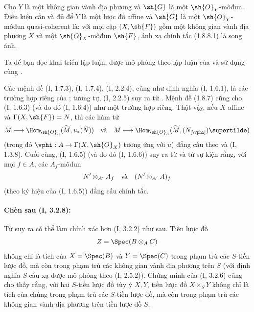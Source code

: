 \documentclass[oneside,10pt]{amsart}
\makeatletter
\newcommand{\ega@arrow}[2]{\mathchoice{#1}{#2}{#2}{#2}}
\renewcommand{\to}{\ega@arrow{\longrightarrow}{\rightarrow}}
\let\EGAOriginalLabel\label
\renewcommand{\label}[1]{\phantomsection\EGAOriginalLabel{#1}}
\makeatother
\begin{document}
\begin{corollary}[1.8.10]
\label{ega2:addendum:I.1.8.10}
Cho $Y$ là một không gian vành địa phương và $\sh{G}$ là một
$\sh{O}_Y$-môđun. Điều kiện cần và đủ để $Y$ là một lược đồ affine và
$\sh{G}$ là một $\sh{O}_Y$-môđun quasi-coherent là: với mọi cặp
$(X,\sh{F})$ gồm một không gian vành địa phương $X$ và một
$\sh{O}_X$-môđun $\sh{F}$, ánh xạ chính tắc (1.8.8.1) là song ánh.
\end{corollary}

Ta để bạn đọc khai triển lập luận, được mô phỏng theo lập luận của
 và sử dụng  cùng .

\begin{remark}[1.8.11]
\label{ega2:addendum:I.1.8.11}
Các mệnh đề (I, 1.7.3), (I, 1.7.4), (I, 2.2.4), cũng như định nghĩa
(I, 1.6.1), là các trường hợp riêng của ; tương tự,
(I, 2.2.5) suy ra từ . Mệnh đề (1.8.7) cũng cho
(I, 1.6.3) (và do đó (I, 1.6.4)) như một trường hợp riêng. Thật vậy,
nếu $X$ affine và $\Gamma(X,\sh{F})=N$, thì các hàm tử
\[
  M\longmapsto
  \Hom_{\sh{O}_S}(\widetilde M,u_*(\widetilde N))
  \quad\hbox{và}\quad
  M\longmapsto
  \Hom_{\sh{O}_S}(\widetilde M,(N_{[\vphi]})\supertilde)
\]
(trong đó $\vphi:A\to\Gamma(X,\sh{O}_X)$ tương ứng với $u$) đẳng cấu
theo  và (I, 1.3.8). Cuối cùng, (I, 1.6.5) (và do đó
(I, 1.6.6)) suy ra từ  và từ sự kiện rằng, với mọi
$f\in A$, các $A_f$-môđun
\[
  N'\otimes_{A'}A_f
  \quad\hbox{và}\quad
  (N'\otimes_{A'}A)_f
\]
(theo ký hiệu của (I, 1.6.5)) đẳng cấu chính tắc.
\end{remark}

\paragraph{Chèn sau (I, 3.2.8):}

\begin{env}[3.2.9]
\label{ega2:addendum:I.3.2.9}
Từ  suy ra có thể làm chính xác hơn (I, 3.2.2) như sau.
Tiền lược đồ
\[
  Z=\Spec(B\otimes_A C)
\]
không chỉ là tích của $X=\Spec(B)$ và $Y=\Spec(C)$ trong phạm trù các
$S$-tiền lược đồ, mà còn trong phạm trù các không gian vành địa
phương trên $S$ (với định nghĩa $S$-cấu xạ được mô phỏng theo
(I, 2.5.2)). Chứng minh của (I, 3.2.6) cũng cho thấy rằng, với hai
$S$-tiền lược đồ tùy ý $X,Y$, tiền lược đồ $X\times_S Y$ không chỉ là
tích của chúng trong phạm trù các $S$-tiền lược đồ, mà còn trong phạm
trù các không gian vành địa phương trên tiền lược đồ $S$.
\end{env}
\end{document}
